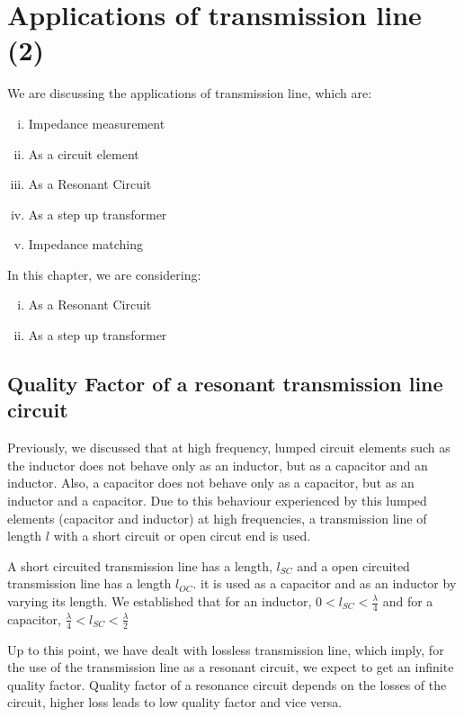 \chapter{Applications of transmission line (2)}\label{lec:lec11}
We are discussing the applications of transmission line, which are:
\begin{enumerate}[(i)]
\item Impedance measurement
\item As a circuit element
\item As a Resonant Circuit
\item As a step up transformer
\item Impedance matching 
\end{enumerate}

In this chapter, we are considering:
\begin{enumerate}[(i)]
\item As a Resonant Circuit
\item As a step up transformer
\end{enumerate}

\section{Quality Factor of a resonant transmission line circuit}
Previously, we discussed that at high frequency, lumped circuit elements such as the inductor does not behave only as an inductor, but as a capacitor and an inductor. Also, a capacitor does not behave only as a capacitor, but as an inductor and a capacitor. Due to this behaviour experienced by this lumped elements (capacitor and inductor) at high frequencies, a transmission line of length $l$ with a short circuit or open circut end is used.

A short circuited transmission line has a length, $l_{SC}$ and a open circuited transmission line has a length $l_{OC}$. it is used as a capacitor and as an inductor by varying its length. We established that for an inductor, $0 < l_{SC} < \frac{\lambda}{4}$ and for a capacitor, $\frac{\lambda}{4} < l_{SC} < \frac{\lambda}{2} $

Up to this point, we have dealt with lossless transmission line, which imply, for the use of the transmission line as a resonant circuit, we expect to get an infinite quality factor. Quality factor of a resonance circuit depends on the losses of the circuit, higher loss leads to low quality factor and vice versa.

